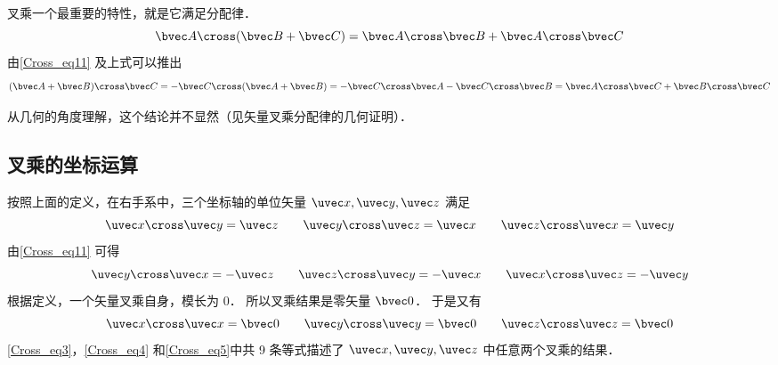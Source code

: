 叉乘一个最重要的特性，就是它满足分配律．
\begin{equation}\label{Cross_eq6}
\bvec A \cross (\bvec B +\bvec C) = \bvec A \cross \bvec B + \bvec A \cross \bvec C
\end{equation}
由\autoref{Cross_eq11} 及上式可以推出
\begin{equation}\label{Cross_eq7}
(\bvec A + \bvec B) \cross \bvec C =  - \bvec C \cross (\bvec A + \bvec B) =  - \bvec C \cross \bvec A - \bvec C \cross \bvec B = \bvec A \cross \bvec C + \bvec B \cross \bvec C
\end{equation}

从几何的角度理解，这个结论并不显然（见矢量叉乘分配律的几何证明）．

\subsection{叉乘的坐标运算}

按照上面的定义，在右手系中，三个坐标轴的单位矢量 $\uvec x, \uvec y, \uvec z$ 满足
\begin{equation}\label{Cross_eq3}
\uvec x \cross \uvec y = \uvec z
\qquad
\uvec y \cross \uvec z = \uvec x
\qquad
\uvec z \cross \uvec x = \uvec y
\end{equation}
由\autoref{Cross_eq11} 可得
\begin{equation}\label{Cross_eq4}
\uvec y \cross \uvec x =  - \uvec z
\qquad
\uvec z \cross \uvec y =  - \uvec x
\qquad
\uvec x \cross \uvec z =  - \uvec y
\end{equation}
根据定义，一个矢量叉乘自身，模长为 $0$． 所以叉乘结果是零矢量 $\bvec 0$． 于是又有
\begin{equation}\label{Cross_eq5}
\uvec x \cross \uvec x = \bvec 0
\qquad
\uvec y \cross \uvec y = \bvec 0
\qquad
\uvec z \cross \uvec z = \bvec 0
\end{equation}
\autoref{Cross_eq3}，\autoref{Cross_eq4} 和\autoref{Cross_eq5}中共 9 条等式描述了 $\uvec x, \uvec y, \uvec z$ 中任意两个叉乘的结果．



